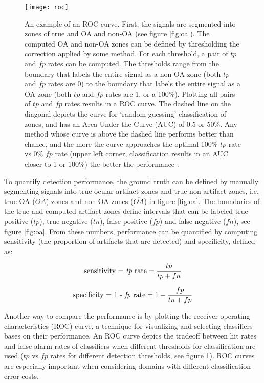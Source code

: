 \documentclass[twoside]{article}
\begin{document}
\begin{figure}[h]
\centering

  \texttt{[image: roc]}
  \caption{An example of an ROC curve. First, the signals are segmented into zones of true and OA and non-OA (see figure \ref{fig:oa}). The computed OA and non-OA zones can be defined by thresholding the correction applied by some method. For each threshold, a pair of $tp$ and $fp$ rates can be computed. The thresholds range from the boundary that labels the entire signal as a non-OA zone (both $tp$ and $fp$ rates are 0) to the boundary that labels the entire signal as a OA zone (both $tp$ and $fp$ rates are 1, or a 100\%). Plotting all pairs of $tp$ and $fp$ rates results in a ROC curve. The dashed line on the diagonal depicts the curve for `random guessing' classification of zones, and has an Area Under the Curve (AUC) of 0.5 or 50\%. Any method whose curve is above the dashed line performs better than chance, and the more the curve approaches the optimal 100\% $tp$ rate vs 0\% $fp$ rate (upper left corner, classification results in an AUC closer to 1 or 100\%) the better the performance \cite{roc}.}
  

\label{fig:roc}
\end{figure}

To quantify detection performance, the ground truth can be defined by manually segmenting signals into true ocular artifact zones and true non-artifact zones, i.e. true OA ($OA$) zones and non-OA zones ($\overline{OA}$) in figure \ref{fig:oa}. The boundaries of the true and computed artifact zones define intervals that can be labeled true positive ($tp$), true negative ($tn$), false positive ($fp$) and false negative ($fn$), see figure \ref{fig:oa}. From these numbers, performance can be quantified by computing sensitivity (the proportion of artifacts that are detected) and specificity, defined as:

\begin{align}\textrm{sensitivity = \textit{tp} rate} = \frac{tp}{tp+fn}\end{align}


\begin{align}\textrm{specificity = 1 - \textit{fp} rate} = 1 - \frac{fp}{tn+fp} \end{align}

Another way to compare the performance is by plotting the receiver operating characteristics (ROC) curve, a technique for visualizing and selecting classifiers bases on their performance. An ROC curve depics the tradeoff between hit rates and false alarm rates of classifiers when different thresholds for classification are used ($tp$ vs $fp$ rates for different detection thresholds, see figure \ref{fig:roc}). ROC curves are especially important when considering domains with different classification error costs.
\end{document}
